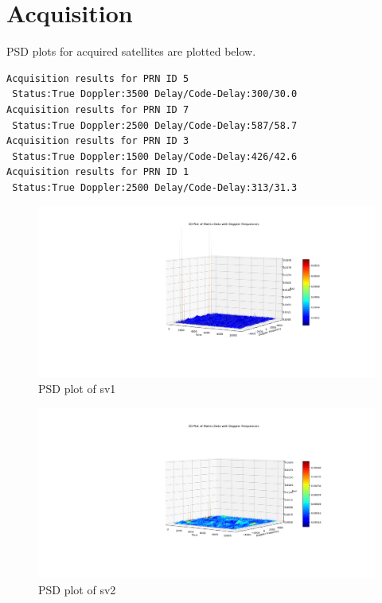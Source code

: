 
\section{Acquisition}
PSD plots for acquired satellites are plotted below.
\begin{lstlisting}
Acquisition results for PRN ID 5
 Status:True Doppler:3500 Delay/Code-Delay:300/30.0
Acquisition results for PRN ID 7
 Status:True Doppler:2500 Delay/Code-Delay:587/58.7
Acquisition results for PRN ID 3
 Status:True Doppler:1500 Delay/Code-Delay:426/42.6
Acquisition results for PRN ID 1
 Status:True Doppler:2500 Delay/Code-Delay:313/31.3
\end{lstlisting}

\begin{normalsize}
\begin{figure}[!ht]
\centering
\includegraphics[width=1\textwidth]{figs/sv1_acq.png}
\centering
\captionsetup{justification=centering}
\caption{PSD plot of sv1}
\end{figure}
\end{normalsize}

\begin{normalsize}
\begin{figure}[ht]
\centering
\includegraphics[width=1\textwidth]{figs/sv2_acq.png}
\centering
\captionsetup{justification=centering}
\caption{PSD plot of sv2}
\end{figure}
\end{normalsize}

